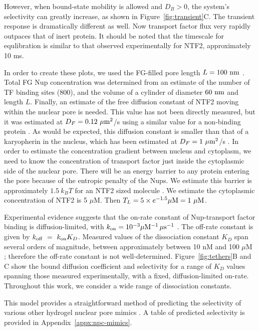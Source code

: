 However, when bound-state mobility is allowed and $D_B > 0$, the system's selectivity can greatly increase, as shown in Figure~\ref{fig:transient}C.  The transient response is dramatically different as well.  Now transport factor flux very rapidly outpaces that of inert protein.  It should be noted that the timescale for equlibration is similar to that observed experimentally for NTF2, approximately 10 ms.

In order to create these plots, we used the FG-filled pore length $L = 100\ {\rm nm}$
\cite{frenkiel-krispin10, maimon12}.  Total FG Nup concentration was determined from an estimate of the number of TF binding sites (800), and the volume of a cylinder of diameter $60\ {\rm nm}$ and length $L$.  Finally, an estimate of the free diffusion constant of NTF2 moving within the nuclear pore is needed.  This value has not been directly measured, but it was estimated at $D_F = 0.12 \ \mu\mathrm{m}^2$/s using a similar value for a non-binding protein \cite{ribbeck01}.  As would be expected, this diffusion constant is smaller than that of a karyopherin in the nucleus, which has been estimated at $D_F =1 \ \mu\mathrm{m}^2$/s \cite{cardarelli10}.  In order to estimate the concentration gradient between nucleus and cytoplasm, we need to know the concentration of transport factor just inside the cytoplasmic side of the nuclear pore.  There will be an energy barrier to any protein entering the pore because of the entropic penalty of the Nups.  We estimate this barrier is approximately $1.5\ k_B T$ for an NTF2 sized molecule \cite{timney16}.  We estimate the cytoplasmic concentration of NTF2 is 5 $\mu$M.  Then $T_L= 5 \times e^{-1.5} \mu \mathrm{M} = 1 \mathrm{\ \mu M}$.  

Experimental evidence suggests that the on-rate constant of Nup-transport factor binding is diffusion-limited, with $k_{\rm on} = 10^{-3}\mu \mathrm{M}^{-1} \, \mu \mathrm{s}^{-1}$ \cite{milles15, hough15}.  The off-rate constant is given by $k_{\rm off} ~=~k_{\rm on} K_D$.  Measured values of the dissociation constant $K_D$ span several orders of magnitude, between approximately between 10 nM and 100 $\mu$M \cite{pyhtila03, gilchrist02, tetenbaum-novatt12-1,
  milles15, timney16, vovk16, hayama18}; therefore the off-rate constant is not well-determined.  Figure~\ref{fig:tethers}B and C show the bound diffusion coefficient and selectivity for a range of $K_D$ values spanning those measured experimentally, with a fixed, diffusion-limited on-rate.  Throughout this work, we consider a wide range of dissociation constants.

This model provides a straightforward method of predicting the selectivity of various other hydrogel nuclear pore mimics \cite{frey09,ader10,frey07,kim15}.  A table of predicted selectivity is provided in Appendix~\ref{appx:npc-mimics}.

